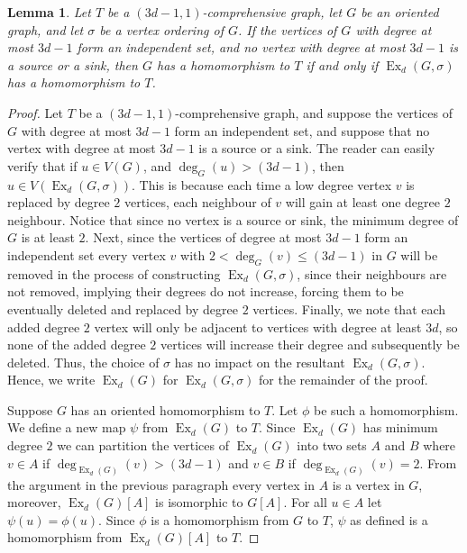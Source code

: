 \documentclass[11pt]{article}
\newtheorem{lemma}[theorem]{Lemma}
\theoremstyle{definition}
\DeclareMathOperator{\ex}{\text{Ex}}
\begin{document}
\begin{lemma}\label{Lemma: extendedEquiv}
    Let $T$ be a $(3d-1,1)$-comprehensive graph,
    let $G$ be an oriented graph, and let $\sigma$ be a vertex ordering of $G$.
    If the vertices of $G$ with degree at most $3d-1$ form an independent set,
    and no vertex with degree at most $3d-1$ is a source or a sink,
    then $G$ has a homomorphism to $T$ if and only if 
    $\ex_d(G,\sigma)$ has a homomorphism to $T$.
\end{lemma}

\begin{proof}

    Let $T$ be a $(3d-1,1)$-comprehensive graph,
    and suppose the vertices of $G$ with degree at most $3d-1$ form an independent set,
    and suppose that no vertex with degree at most $3d-1$ is a source or a sink.
    The reader can 
    easily verify that if $u \in V(G)$, and $\deg_G(u) > (3d-1)$,
    then $u \in V(\ex_d(G,\sigma))$.
    This is because each time a low degree vertex $v$ is replaced by degree $2$ vertices,
    each neighbour of $v$ will gain at least one degree $2$ neighbour.
   Notice that since no vertex is a source or sink, the minimum degree of $G$ is at least $2$.
   Next, since the vertices of degree at most $3d-1$ form an independent set 
   every vertex $v$ with $2<\deg_G(v) \leq (3d-1)$ in $G$
    will be removed in the process of constructing $\ex_d(G,\sigma)$,
    since their neighbours are not removed, implying their degrees do not increase,
    forcing them to be eventually deleted and replaced by degree $2$ vertices.
    Finally, we note that each added degree $2$ vertex will only be adjacent to vertices with degree at least $3d$,
    so none of the added degree $2$ vertices will increase their degree and subsequently be deleted. 
    Thus, the choice of $\sigma$ has no impact on the resultant $\ex_d(G,\sigma)$.
    Hence, we write $\ex_d(G)$ for $\ex_d(G,\sigma)$ for the remainder of the proof.
    
    
    Suppose $G$ has an oriented homomorphism to $T$.
    Let $\phi$ be such a homomorphism.
    We define a new map $\psi$ from $\ex_d(G)$  to $T$.
    Since $\ex_d(G)$ has minimum degree $2$ we can partition the vertices of $\ex_d(G)$
    into two sets $A$ and $B$ where $v \in A$ if $\deg_{\ex_d(G)}(v)>(3d-1)$ and $v \in B$ if $\deg_{\ex_d(G)}(v)=2$.
    From the argument in the previous paragraph every vertex in $A$ is a vertex in $G$,
    moreover, $\ex_d(G)[A]$ is isomorphic to $G[A]$.
    For all $u \in A$ let $\psi(u) = \phi(u)$.
    Since $\phi$ is a homomorphism from $G$ to $T$, $\psi$ as defined is a homomorphism from 
    $\ex_d(G)[A]$ to $T$.
    

\end{proof}
\end{document}

